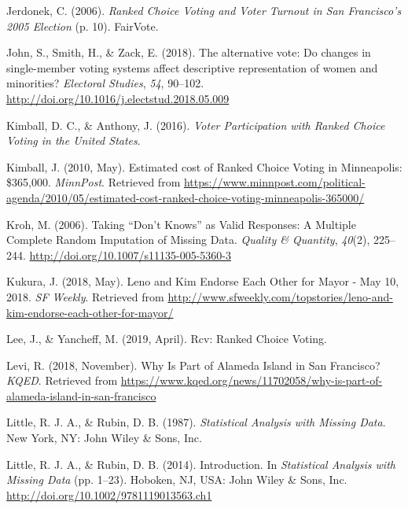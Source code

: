 \documentclass[12pt,twoside]{reedthesis}
\begin{document}
\leavevmode\hypertarget{ref-jerdonek_ranked_2006}{}%
Jerdonek, C. (2006). \emph{Ranked Choice Voting and Voter Turnout in San Francisco's 2005 Election} (p. 10). FairVote.

\leavevmode\hypertarget{ref-john_alternative_2018}{}%
John, S., Smith, H., \& Zack, E. (2018). The alternative vote: Do changes in single-member voting systems affect descriptive representation of women and minorities? \emph{Electoral Studies}, \emph{54}, 90--102. \url{http://doi.org/10.1016/j.electstud.2018.05.009}

\leavevmode\hypertarget{ref-kimball_voter_2016}{}%
Kimball, D. C., \& Anthony, J. (2016). \emph{Voter Participation with Ranked Choice Voting in the United States}.

\leavevmode\hypertarget{ref-kimball_estimated_2010}{}%
Kimball, J. (2010, May). Estimated cost of Ranked Choice Voting in Minneapolis: \$365,000. \emph{MinnPost}. Retrieved from \url{https://www.minnpost.com/political-agenda/2010/05/estimated-cost-ranked-choice-voting-minneapolis-365000/}

\leavevmode\hypertarget{ref-kroh_taking_2006}{}%
Kroh, M. (2006). Taking ``Don't Knows'' as Valid Responses: A Multiple Complete Random Imputation of Missing Data. \emph{Quality \& Quantity}, \emph{40}(2), 225--244. \url{http://doi.org/10.1007/s11135-005-5360-3}

\leavevmode\hypertarget{ref-kukura_leno_2018}{}%
Kukura, J. (2018, May). Leno and Kim Endorse Each Other for Mayor - May 10, 2018. \emph{SF Weekly}. Retrieved from \url{http://www.sfweekly.com/topstories/leno-and-kim-endorse-each-other-for-mayor/}

\leavevmode\hypertarget{ref-lee_rcv_2019}{}%
Lee, J., \& Yancheff, M. (2019, April). Rcv: Ranked Choice Voting.

\leavevmode\hypertarget{ref-levi_why_2018}{}%
Levi, R. (2018, November). Why Is Part of Alameda Island in San Francisco? \emph{KQED}. Retrieved from \url{https://www.kqed.org/news/11702058/why-is-part-of-alameda-island-in-san-francisco}

\leavevmode\hypertarget{ref-little_statistical_1987}{}%
Little, R. J. A., \& Rubin, D. B. (1987). \emph{Statistical Analysis with Missing Data}. New York, NY: John Wiley \& Sons, Inc.

\leavevmode\hypertarget{ref-little_introduction_2014}{}%
Little, R. J. A., \& Rubin, D. B. (2014). Introduction. In \emph{Statistical Analysis with Missing Data} (pp. 1--23). Hoboken, NJ, USA: John Wiley \& Sons, Inc. \url{http://doi.org/10.1002/9781119013563.ch1}
\end{document}
